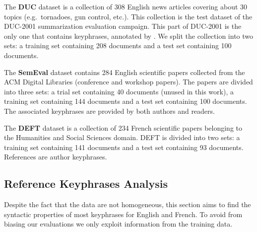     The \textbf{DUC} dataset \cite{over2001duc} is a collection of 308 English
    news articles covering about 30 topics (e.g.~tornadoes, gun control, etc.).
    This collection is the test dataset of the DUC-2001 summarization evaluation
    campaign. This part of DUC-2001 is the only one that contains keyphrases,
    annotated by . We split the collection into two
    sets: a training set containing 208 documents and a test set containing 100
    documents.

    The \textbf{SemEval} dataset \cite{kim2010semeval} contains 284 English
    scientific papers collected from the ACM Digital Libraries (conference and
    workshop papers). The papers are divided into three sets: a trial set
    containing 40 documents (unused in this work), a training set containing 144
    documents and a test set containing 100 documents. The associated keyphrases
    are provided by both authors and readers.

    The \textbf{DEFT} dataset \cite{Paroubek2012deft} is a collection of 234
    French scientific papers belonging to the Humanities and Social Sciences
    domain. DEFT is divided into two sets: a training set containing 141
    documents and a test set containing 93 documents. References are author
    keyphrases.

  \subsection{Reference Keyphrases Analysis}
  \label{subsec:keyphrase_analysis}
    Despite the fact that the data are not homogeneous, this section aims to
    find the syntactic properties of most keyphrases for English and French. To
    avoid from biasing our evaluations we only exploit information from the
    training data.

